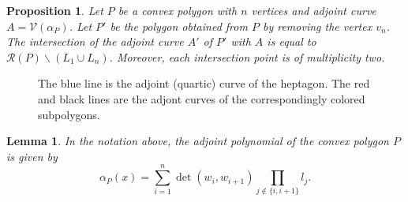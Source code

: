 \documentclass[10pt,a4paper]{amsart}
\newtheorem{lem}{Lemma}
\newtheorem{prop}{Proposition}
\newcommand{\cR}{{\mathcal R}}
\newcommand{\cV}{{\mathcal V}}
\begin{document}
\begin{prop}\label{thm:adjointcontact}
    Let $P$ be a convex polygon with $n$ vertices and adjoint curve $A = \cV(\alpha_P)$. Let $P'$ be the polygon obtained from $P$ by removing the vertex $v_n$. The intersection of the adjoint curve $A'$ of $P'$ with $A$ is equal to $\cR(P) \smallsetminus (L_1 \cup L_n)$. Moreover, each intersection point is of multiplicity two.
\end{prop}

\begin{figure}[h]
    \centering
    
    \caption{The blue line is the adjoint (quartic) curve of the heptagon. The red and black lines are the adjont curves of the correspondingly colored subpolygons.}
    \label{fig:WLOGsubquadril}
\end{figure}

\begin{lem}
    In the notation above, the adjoint polynomial of the convex polygon $P$ is given by
    \begin{equation} \label{eq:adjpol_expl}
        \alpha_P(x) = \sum_{i = 1}^n \det(w_i, w_{i+1}) \prod_{j \not\in\{ i, i+1\}} l_j.
    \end{equation}
\end{lem}
\end{document}
